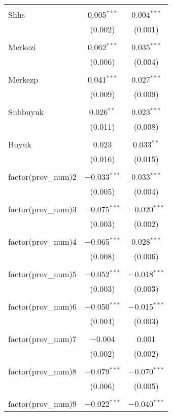 \begin{table}[!htbp]
\begin{tabular}{@{\extracolsep{5pt}}lcc}
  & & \\ 
 Shhs & 0.005$^{***}$ & 0.004$^{***}$ \\ 
  & (0.002) & (0.001) \\ 
  & & \\ 
 Merkezi & 0.062$^{***}$ & 0.035$^{***}$ \\ 
  & (0.006) & (0.004) \\ 
  & & \\ 
 Merkezp & 0.041$^{***}$ & 0.027$^{***}$ \\ 
  & (0.009) & (0.009) \\ 
  & & \\ 
 Subbuyuk & 0.026$^{**}$ & 0.023$^{***}$ \\ 
  & (0.011) & (0.008) \\ 
  & & \\ 
 Buyuk & 0.023 & 0.033$^{**}$ \\ 
  & (0.016) & (0.015) \\ 
  & & \\ 
 factor(prov\_num)2 & $-$0.033$^{***}$ & 0.033$^{***}$ \\ 
  & (0.005) & (0.004) \\ 
  & & \\ 
 factor(prov\_num)3 & $-$0.075$^{***}$ & $-$0.020$^{***}$ \\ 
  & (0.003) & (0.002) \\ 
  & & \\ 
 factor(prov\_num)4 & $-$0.065$^{***}$ & 0.028$^{***}$ \\ 
  & (0.008) & (0.006) \\ 
  & & \\ 
 factor(prov\_num)5 & $-$0.052$^{***}$ & $-$0.018$^{***}$ \\ 
  & (0.003) & (0.003) \\ 
  & & \\ 
 factor(prov\_num)6 & $-$0.050$^{***}$ & $-$0.015$^{***}$ \\ 
  & (0.004) & (0.003) \\ 
  & & \\ 
 factor(prov\_num)7 & $-$0.004 & 0.001 \\ 
  & (0.002) & (0.002) \\ 
  & & \\ 
 factor(prov\_num)8 & $-$0.079$^{***}$ & $-$0.070$^{***}$ \\ 
  & (0.006) & (0.005) \\ 
  & & \\ 
 factor(prov\_num)9 & $-$0.022$^{***}$ & $-$0.040$^{***}$ \\ 

\end{tabular}
\end{table}

